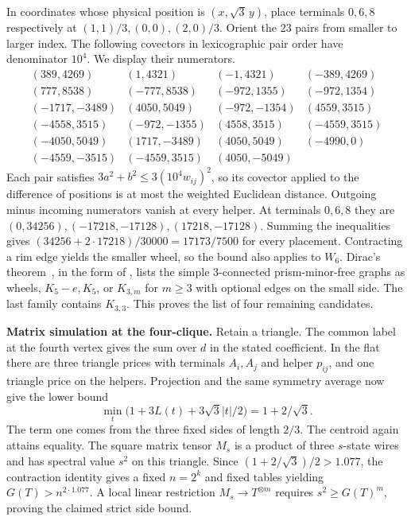 \documentclass[11pt,letterpaper]{article}
\begin{document}
In coordinates whose physical position is \((x,\sqrt3\,y)\), place terminals \(0,6,8\) respectively at \((1,1)/3,(0,0),(2,0)/3\). Orient the 23 pairs from smaller to larger index. The following covectors in lexicographic pair order have denominator \(10^4\). We display their numerators.
\[
\begin{array}{rrrr}
(389,4269)&(1,4321)&(-1,4321)&(-389,4269)\\
(777,8538)&(-777,8538)&(-972,1355)&(-972,1354)\\
(-1717,-3489)&(4050,5049)&(-972,-1354)&(4559,3515)\\
(-4558,3515)&(-972,-1355)&(4558,3515)&(-4559,3515)\\
(-4050,5049)&(1717,-3489)&(4050,5049)&(-4990,0)\\
(-4559,-3515)&(-4559,3515)&(4050,-5049)&
\end{array}
\]
Each pair satisfies \(3a^2+b^2\le3(10^4 w_{ij})^2\), so its covector applied to the difference of positions is at most the weighted Euclidean distance. Outgoing minus incoming numerators vanish at every helper. At terminals \(0,6,8\) they are \((0,34256),(-17218,-17128),(17218,-17128)\). Summing the inequalities gives \((34256+2\cdot17218)/30000=17173/7500\) for every placement. Contracting a rim edge yields the smaller wheel, so the bound also applies to \(W_6\). Dirac's theorem~\cite{dirac-structure}, in the form of \cite[Theorem~2]{costalonga-kingan-kingan}, lists the simple 3-connected prism-minor-free graphs as wheels, \(K_5-e,K_5\), or \(K_{3,m}\) for \(m\ge3\) with optional edges on the small side. The last family contains \(K_{3,3}\). This proves the list of four remaining candidates.

\textbf{Matrix simulation at the four-clique.} Retain a triangle. The common label at the fourth vertex gives the sum over \(d\) in the stated coefficient. In the flat there are three triangle prices with terminals \(A_i,A_j\) and helper \(p_{ij}\), and one triangle price on the helpers. Projection and the same symmetry average now give the lower bound
\[
        \min_t\big(1+3L(t)+3\sqrt3|t|/2\big)=1+2/\sqrt3 .
\]
The term one comes from the three fixed sides of length \(2/3\). The centroid again attains equality. The square matrix tensor \(M_s\) is a product of three \(s\)-state wires and has spectral value \(s^2\) on this triangle. Since \((1+2/\sqrt3)/2>1.077\), the contraction identity gives a fixed \(n=2^k\) and fixed tables yielding \(G(T)>n^{2\cdot1.077}\). A local linear restriction \(M_s\to T^{\otimes m}\) requires \(s^2\ge G(T)^m\), proving the claimed strict side bound.
\end{document}
